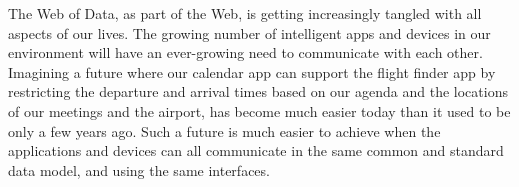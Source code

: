 The Web of Data, as part of the Web, is getting increasingly tangled with all aspects of our lives.
The growing number of intelligent apps and devices in our environment will have an ever-growing need to communicate with each other.
Imagining a future where our calendar app can support the flight finder app by restricting the departure and arrival times based on our agenda and the locations of our meetings and the airport, has become much easier today than it used to be only a few years ago.
Such a future is much easier to achieve when the applications and devices can all communicate in the same common and standard data model, and using the same interfaces.

